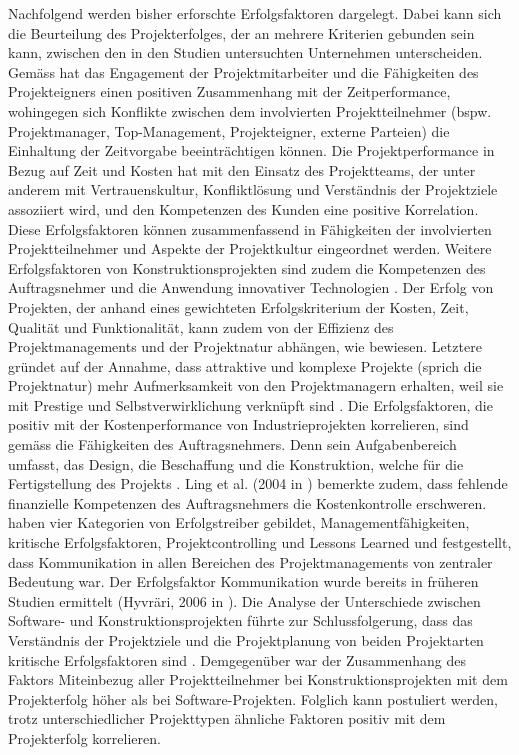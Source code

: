 Nachfolgend werden bisher erforschte Erfolgsfaktoren dargelegt. Dabei kann sich die Beurteilung des Projekterfolges, der an mehrere Kriterien gebunden sein kann, zwischen den in den Studien untersuchten Unternehmen unterscheiden. Gemäss \citep{iyerjha06} hat das Engagement der Projektmitarbeiter und die Fähigkeiten des Projekteigners einen positiven Zusammenhang mit der Zeitperformance, wohingegen sich Konflikte zwischen dem involvierten Projektteilnehmer (bspw. Projektmanager, Top-Management, Projekteigner, externe Parteien) die Einhaltung der Zeitvorgabe beeinträchtigen können. Die Projektperformance in Bezug auf Zeit und Kosten hat mit den Einsatz des Projektteams, der unter anderem mit Vertrauenskultur, Konfliktlösung und Verständnis der Projektziele assoziiert wird, und den Kompetenzen des Kunden eine positive Korrelation\citet{chahota01}. Diese Erfolgsfaktoren können zusammenfassend in Fähigkeiten der involvierten Projektteilnehmer und Aspekte der Projektkultur eingeordnet werden. Weitere Erfolgsfaktoren von Konstruktionsprojekten sind zudem die Kompetenzen des Auftragsnehmer und die Anwendung innovativer Technologien \citep{chahota01}. Der Erfolg von Projekten, der anhand eines gewichteten Erfolgskriterium der Kosten, Zeit, Qualität und Funktionalität, kann zudem von der Effizienz des Projektmanagements und der Projektnatur abhängen, wie \citet{lchch08} bewiesen. Letztere gründet auf der Annahme, dass attraktive und komplexe Projekte (sprich die Projektnatur) mehr Aufmerksamkeit von den Projektmanagern erhalten, weil sie mit Prestige und Selbstverwirklichung verknüpft sind \citep{lchch08}. Die Erfolgsfaktoren, die positiv mit der Kostenperformance von Industrieprojekten korrelieren, sind gemäss \citet{luhuazha17} die Fähigkeiten des Auftragsnehmers. Denn sein Aufgabenbereich umfasst, das Design, die Beschaffung und die Konstruktion, welche für die Fertigstellung des Projekts \citep{luhuazha17}. Ling et al. (2004 in \citealp*{luhuazha17}) bemerkte zudem, dass fehlende finanzielle Kompetenzen des Auftragsnehmers die Kostenkontrolle erschweren.
\newline \citet{BeDeNov2015} haben vier Kategorien von Erfolgstreiber gebildet, Managementfähigkeiten, kritische Erfolgsfaktoren, Projektcontrolling und \glqq Lessons Learned\grqq{ } und festgestellt, dass Kommunikation in allen Bereichen des Projektmanagements von zentraler Bedeutung war. Der Erfolgsfaktor Kommunikation wurde bereits in früheren Studien ermittelt (Hyvräri, 2006 in \citealp*{BeDeNov2015}). Die Analyse der Unterschiede zwischen Software- und Konstruktionsprojekten führte zur Schlussfolgerung, dass das Verständnis der Projektziele und die Projektplanung von beiden Projektarten kritische Erfolgsfaktoren sind \citep{VarDom14}. Demgegenüber war der Zusammenhang des Faktors \glqq Miteinbezug aller Projektteilnehmer \grqq{ } bei Konstruktionsprojekten mit dem Projekterfolg höher als bei Software-Projekten. Folglich kann postuliert werden, trotz unterschiedlicher Projekttypen ähnliche Faktoren positiv mit dem Projekterfolg korrelieren.
